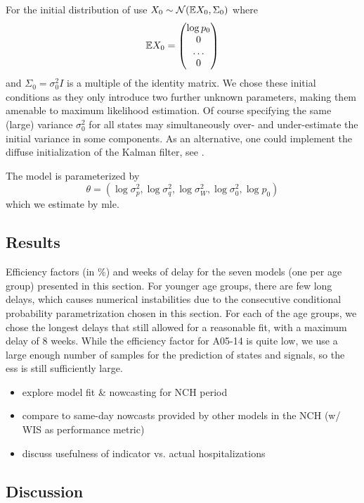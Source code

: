 For the initial distribution of use $X_{0} \sim \mathcal N(\mathbb E X_{0}, \Sigma_0)$ where 
$$
    \mathbb E X_{0} = \begin{pmatrix}
        \log p_{0} \\
        0 \\
        \dots \\
        0
    \end{pmatrix}
$$
and $\Sigma_{0} = \sigma^{2}_0 I$ is a multiple of the identity matrix. We chose these initial conditions as they only introduce two further unknown parameters, making them amenable to maximum likelihood estimation. Of course specifying the same (large) variance $\sigma^{2}_0$ for all states may simultaneously over- and under-estimate the initial variance in some components. As an alternative, one could implement the diffuse initialization of the Kalman filter, see \citep{Ansley1985Estimation,Koopman1997Exact}.

The model is parameterized by 
$$
    \theta = \left( \log \sigma^{2}_{p}, \log \sigma_{q}^{2}, \log \sigma^{2}_W, \log \sigma^{2}_0, \log p_{0} \right)
$$
which we estimate by \acrshort{mle}. 





\subsection{Results}

\begin{table}
    \centering
    
    \caption{Efficiency factors (in \%) and weeks of delay for the seven models (one per age group) presented in this section. For younger age groups, there are few long delays, which causes numerical instabilities due to the consecutive conditional probability parametrization chosen in this section. For each of the age groups, we chose the longest delays that still allowed for a reasonable fit, with a maximum delay of $8$ weeks. While the efficiency factor for A05-14 is quite low, we use a large enough number of samples for the prediction of states and signals, so the \acrshort{ess} is still sufficiently large.}
    \label{tab:hospitalization_showcase_ess}
\end{table}

\begin{itemize}
    \item explore model fit \& nowcasting for NCH period
    \item compare to same-day nowcasts provided by other models in the NCH (w/ WIS as performance metric)
    \item discuss usefulness of indicator vs. actual hospitalizations
\end{itemize}

\subsection{Discussion}